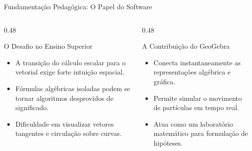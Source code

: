 \documentclass[aspectratio=169, 13pt]{beamer}
\begin{document}
	\begin{frame}{Fundamentação Pedagógica: O Papel do Software}
		\begin{columns}[T]
			\begin{column}{0.48\textwidth}
				\begin{block}{O Desafio no Ensino Superior}
					\begin{itemize}
						\item A transição do cálculo escalar para o vetorial exige forte intuição espacial.
						\item Fórmulas algébricas isoladas podem se tornar algoritmos desprovidos de significado.
						\item Dificuldade em visualizar vetores tangentes e circulação sobre curvas.
					\end{itemize}
				\end{block}
			\end{column}
			
			\begin{column}{0.48\textwidth}
				\begin{exampleblock}{A Contribuição do GeoGebra}
					\begin{itemize}
						\item Conecta instantaneamente as representações algébrica e gráfica.
						\item Permite simular o movimento de partículas em tempo real.
						\item Atua como um laboratório matemático para formulação de hipóteses.
					\end{itemize}
				\end{exampleblock}
			\end{column}
		\end{columns}
	\end{frame}
	
\end{document}
